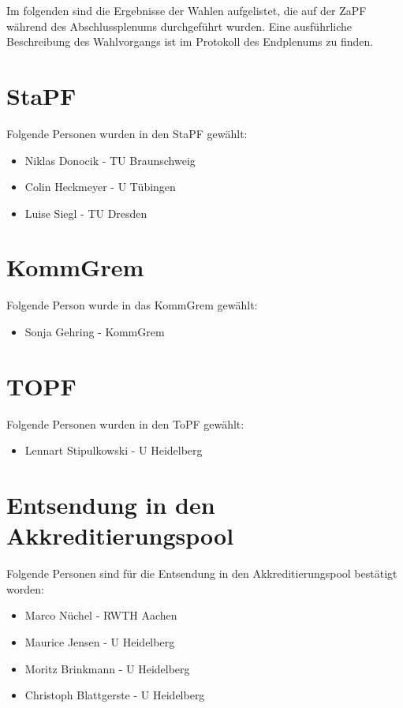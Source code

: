 
Im folgenden sind die Ergebnisse der Wahlen aufgelistet, die auf der ZaPF während des Abschlussplenums durchgeführt wurden.
Eine ausführliche Beschreibung des Wahlvorgangs ist im Protokoll des Endplenums zu finden.

    \section{StaPF}
      Folgende Personen wurden in den StaPF gewählt:
        \begin{itemize}
          \item Niklas Donocik - TU Braunschweig
          \item Colin Heckmeyer - U Tübingen
          \item Luise Siegl - TU Dresden
        \end{itemize}

    \section{KommGrem}
      Folgende Person wurde in das KommGrem gewählt:
      \begin{itemize}
        \item Sonja Gehring - KommGrem
      \end{itemize}

    \section{TOPF}
      Folgende Personen wurden in den ToPF gewählt:
      \begin{itemize}
        \item Lennart Stipulkowski - U Heidelberg
      \end{itemize}


    \section{Entsendung in den Akkreditierungspool}
      Folgende Personen sind für die Entsendung in den Akkreditierungspool bestätigt worden:
      \begin{itemize}
        \item Marco Nüchel - RWTH Aachen
        \item Maurice Jensen - U Heidelberg
        \item Moritz Brinkmann - U Heidelberg
        \item Christoph Blattgerste - U Heidelberg
      \end{itemize}


